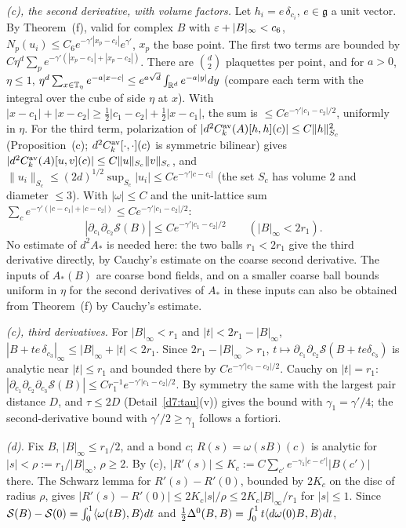 \begin{detail}
\begin{step}
\emph{(c), the second derivative, with volume factors.} Let $h_i=e\,\delta_{c_i}$, $e\in\mathfrak g$ a unit vector. By Theorem~(f), valid for complex $B$ with $\varepsilon+|B|_\infty<c_6$, $N_p(u_i)\le C_6e^{-\gamma'|x_p-c_i|}e^{\gamma'}$, $x_p$ the base point. The first two terms are bounded by $C\eta^d\sum_pe^{-\gamma'(|x_p-c_1|+|x_p-c_2|)}$. There are $\binom d2$ plaquettes per point, and for $a>0$, $\eta\le1$, $\eta^d\sum_{x\in\mathbb T_\eta}e^{-a|x-c|}\le e^{a\sqrt d}\int_{\mathbb R^d}e^{-a|y|}dy$ (compare each term with the integral over the cube of side $\eta$ at $x$). With $|x-c_1|+|x-c_2|\ge\frac12|c_1-c_2|+\frac12|x-c_1|$, the sum is $\le Ce^{-\gamma'|c_1-c_2|/2}$, uniformly in $\eta$. For the third term, polarization of $|d^2C^{\rm av}_k(A)[h,h](c)|\le C\|h\|^2_{S_c}$ (Proposition~(c); $d^2C^{\rm av}_k[\cdot,\cdot](c)$ is symmetric bilinear) gives $|d^2C^{\rm av}_k(A)[u,v](c)|\le C\|u\|_{S_c}\|v\|_{S_c}$, and $\|u_i\|_{S_c}\le(2d)^{1/2}\sup_{S_c}|u_i|\le Ce^{-\gamma'|c-c_i|}$ (the set $S_c$ has volume $2$ and diameter $\le3$). With $|\omega|\le C$ and the unit-lattice sum $\sum_ce^{-\gamma'(|c-c_1|+|c-c_2|)}\le Ce^{-\gamma'|c_1-c_2|/2}$:
\[
|\partial_{c_1}\partial_{c_2}\mathcal S(B)|\le Ce^{-\gamma'|c_1-c_2|/2}\qquad(|B|_\infty<2r_1).
\]
No estimate of $d^2A_*$ is needed here: the two balls $r_1<2r_1$ give the third derivative directly, by Cauchy's estimate on the coarse second derivative. The inputs of $A_*(B)$ are coarse bond fields, and on a smaller coarse ball bounds uniform in $\eta$ for the second derivatives of $A_*$ in these inputs can also be obtained from Theorem~(f) by Cauchy's estimate.
\end{step}
\begin{step}
\emph{(c), third derivatives.} For $|B|_\infty<r_1$ and $|t|<2r_1-|B|_\infty$, $|B+te\,\delta_{c_3}|_\infty\le|B|_\infty+|t|<2r_1$. Since $2r_1-|B|_\infty>r_1$, $t\mapsto\partial_{c_1}\partial_{c_2}\mathcal S(B+te\delta_{c_3})$ is analytic near $|t|\le r_1$ and bounded there by $Ce^{-\gamma'|c_1-c_2|/2}$. Cauchy on $|t|=r_1$: $|\partial_{c_1}\partial_{c_2}\partial_{c_3}\mathcal S(B)|\le Cr_1^{-1}e^{-\gamma'|c_1-c_2|/2}$. By symmetry the same with the largest pair distance $D$, and $\tau\le2D$ (Detail~\ref{d7:tau}(v)) gives the bound with $\gamma_1=\gamma'/4$; the second-derivative bound with $\gamma'/2\ge\gamma_1$ follows a fortiori.
\end{step}
\begin{step}
\emph{(d).} Fix $B$, $|B|_\infty\le r_1/2$, and a bond $c$; $R(s)=\omega(sB)(c)$ is analytic for $|s|<\rho:=r_1/|B|_\infty$, $\rho\ge2$. By (c), $|R'(s)|\le K_c:=C\sum_{c'}e^{-\gamma_1|c-c'|}|B(c')|$ there. The Schwarz lemma for $R'(s)-R'(0)$, bounded by $2K_c$ on the disc of radius $\rho$, gives $|R'(s)-R'(0)|\le2K_c|s|/\rho\le2K_c|B|_\infty/r_1$ for $|s|\le1$. Since $\mathcal S(B)-\mathcal S(0)=\int_0^1\langle \omega(tB),B\rangle dt$ and $\frac12\Delta^0(B,B)=\int_0^1t\langle d\omega(0)B,B\rangle dt$,

\end{step}
\end{detail}
